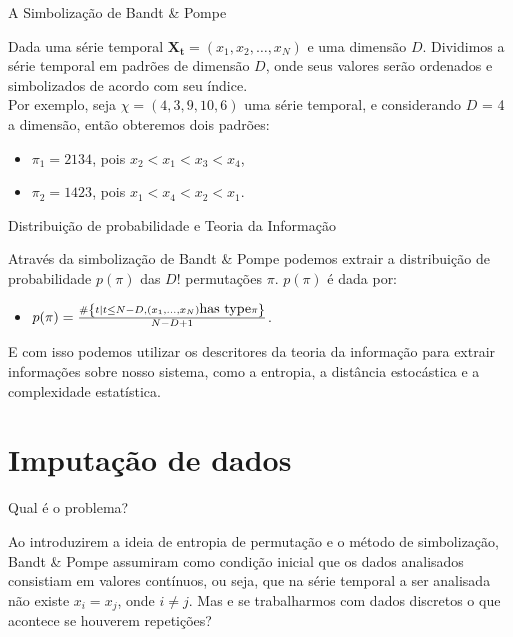 \documentclass{beamer} %
\begin{document}
\begin{frame}{A Simbolização de Bandt \& Pompe}

Dada uma série temporal $\bm {X_t} = (x_1, x_2, \dots, x_N)$ e uma dimensão $D$. Dividimos a série temporal em padrões de dimensão $D$, onde seus valores serão ordenados e simbolizados de acordo com seu índice.\\
\vspace{0.3cm}
Por exemplo, seja $\chi = (4,3,9,10,6)$ uma série temporal, e considerando $D$ = 4 a dimensão, então obteremos dois padrões:\\
\begin{itemize}
    \item$\pi_1 = 2134$, pois $x_2 < x_1 < x_3 < x_4$,
    \item$\pi_2 = 1423$, pois $x_1 < x_4 < x_2 < x_1$.
\end{itemize}
 
\end{frame}

\begin{frame}{Distribuição de probabilidade e Teoria da Informação}

Através da simbolização de Bandt \& Pompe podemos extrair a distribuição de probabilidade $p(\pi)$ das $D!$ permutações $\pi$. $p(\pi)$ é dada por:


\begin{itemize}
    \item $p(\pi) = \frac{\# \left\{t| t \leq N - D, (x_1,\dots,x_N)  \hbox{has type} \pi\right\}}{N - D + 1}$.\\
\end{itemize}


E com isso podemos utilizar os descritores da teoria da informação para extrair informações sobre nosso sistema, como a entropia, a distância estocástica e a complexidade estatística.

\end{frame}

\section{Imputação de dados}

\begin{frame}{Qual é o problema?}

Ao introduzirem a ideia de entropia de permutação e o método de simbolização, Bandt \& Pompe assumiram como condição inicial que os dados analisados consistiam em valores contínuos, ou seja, que na série temporal a ser analisada não existe $x_i = x_j$, onde $i \neq j$. Mas e se trabalharmos com dados discretos o que acontece se houverem repetições?

\end{frame}
\end{document}
